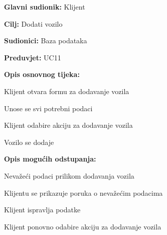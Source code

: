 \noindent {}
\begin{packed_item}

	\item \textbf{Glavni sudionik:} Klijent
	\item \textbf{Cilj:} Dodati vozilo
	\item \textbf{Sudionici:} Baza podataka
	\item \textbf{Preduvjet:} UC11
	\item \textbf{Opis osnovnog tijeka:}
	
	\item[] \begin{packed_enum}
		
		\item Klijent otvara formu za dodavanje vozila
		\item Unose se svi potrebni podaci
		\item Klijent odabire akciju za dodavanje vozila
		\item Vozilo se dodaje

	\end{packed_enum}
	
	\item  \textbf{Opis mogućih odstupanja:}
	
	\item[] \begin{packed_item}
		
		\item[6.a] Nevažeći podaci prilikom dodavanja vozila
		\item[] \begin{packed_enum}
			
			\item Klijentu se prikazuje poruka o nevažećim podacima
			\item Klijent ispravlja podatke
			\item Klijent ponovno odabire akciju za dodavanje vozila
			
		\end{packed_enum}
		
	\end{packed_item}
\end{packed_item}

\pagebreak

